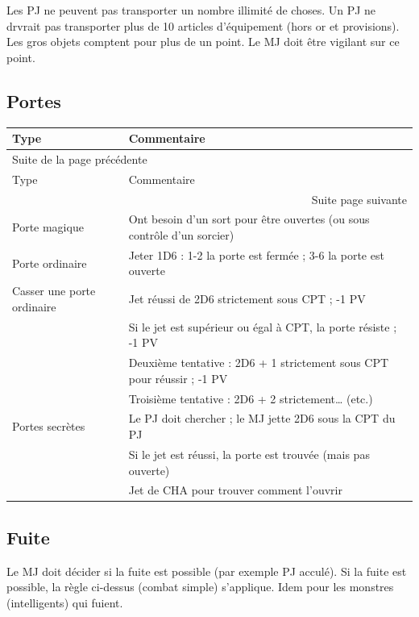 \documentclass[a4paper, 11pt, twoside]{article}
\begin{document}
Les PJ ne peuvent pas transporter un nombre illimité de choses. Un PJ ne drvrait pas transporter plus de 10 articles d'équipement (hors or et provisions). Les gros objets comptent pour plus de un point. Le MJ doit être vigilant sur ce point.

\subsection{Portes}
\label{sec:orgdc57dbb}

\begin{longtable}{l|l}
Type & Commentaire\\
\hline
\endfirsthead
\multicolumn{2}{l}{Suite de la page précédente} \\
\hline

Type & Commentaire \\

\hline
\endhead
\hline\multicolumn{2}{r}{Suite page suivante} \\
\endfoot
\endlastfoot
\hline
Porte magique & Ont besoin d'un sort pour être ouvertes (ou sous contrôle d'un sorcier)\\
Porte ordinaire & Jeter 1D6 : 1-2 la porte est fermée ; 3-6 la porte est ouverte\\
Casser une porte ordinaire & Jet réussi de 2D6 strictement sous CPT ; -1 PV\\
 & Si le jet est supérieur ou égal à CPT, la porte résiste ; -1 PV\\
 & Deuxième tentative : 2D6 + 1 strictement sous CPT pour réussir ; -1 PV\\
 & Troisième tentative : 2D6 + 2 strictement\ldots{} (etc.)\\
Portes secrètes & Le PJ doit chercher ; le MJ jette 2D6 sous la CPT du PJ\\
 & Si le jet est réussi, la porte est trouvée (mais pas ouverte)\\
 & Jet de CHA pour trouver comment l'ouvrir\\
\end{longtable}

\subsection{Fuite}
\label{sec:org8813b1a}

Le MJ doit décider si la fuite est possible (par exemple PJ acculé). Si la fuite est possible, la règle ci-dessus (combat simple) s'applique. Idem pour les monstres (intelligents) qui fuient.
\end{document}
